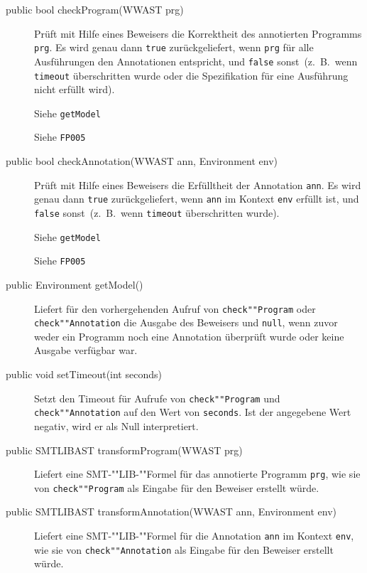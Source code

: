 \begin{description}%
    \item[public bool checkProgram(WWAST prg)]

    Prüft mit Hilfe eines Beweisers die Korrektheit des annotierten
    Programms \texttt{prg}. Es wird genau dann \texttt{true}
    zurückgeliefert, wenn \texttt{prg} für alle Ausführungen den
    Annotationen entspricht, und \texttt{false} sonst~(z.~B.\, wenn
    \texttt{timeout} überschritten wurde oder die Spezifikation für
    eine Ausführung nicht erfüllt wird).%

    Siehe \texttt{getModel}%

    Siehe \texttt{FP005}%

    \item[public bool checkAnnotation(WWAST ann, Environment env)]

    Prüft mit Hilfe eines Beweisers die Erfülltheit der Annotation
    \texttt{ann}. Es wird genau dann \texttt{true} zurückgeliefert,
    wenn \texttt{ann} im Kontext \texttt{env} erfüllt ist, und
    \texttt{false} sonst~(z.~B.\, wenn \texttt{timeout} überschritten
    wurde).%

    Siehe \texttt{getModel}%

    Siehe \texttt{FP005}%

    \item[public Environment getModel()]

    Liefert für den vorhergehenden Aufruf von \texttt{check""Program}
    oder \texttt{check""Annotation} die Ausgabe des Beweisers und
    \texttt{null}, wenn zuvor weder ein Programm noch eine Annotation
    überprüft wurde oder keine Ausgabe verfügbar war.%

    \item[public void setTimeout(int seconds)]

    Setzt den Timeout für Aufrufe von \texttt{check""Program} und
    \texttt{check""Annotation} auf den Wert von \texttt{seconds}. Ist
    der angegebene Wert negativ, wird er als Null interpretiert.%

    \item[public SMTLIBAST transformProgram(WWAST prg)]

    Liefert eine SMT-""LIB-""Formel für das annotierte Programm
    \texttt{prg}, wie sie von \texttt{check""Program} als Eingabe für
    den Beweiser erstellt würde.%

    \item[public SMTLIBAST transformAnnotation(WWAST ann, Environment env)]

    Liefert eine SMT-""LIB-""Formel für die Annotation \texttt{ann} im
    Kontext \texttt{env}, wie sie von \texttt{check""Annotation} als
    Eingabe für den Beweiser erstellt würde.%

\end{description}%

